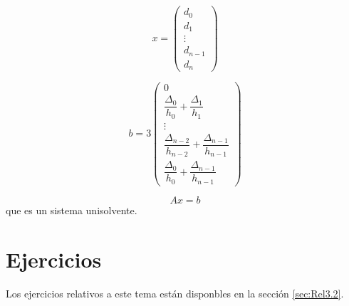$$x=\left( \begin{array}{c}
            d_0     \\
            d_1     \\
            \vdots  \\
            d_{n-1} \\
            d_{n}
        \end{array} \right)$$

$$b=3\left( \begin{array}{c}
            0                                                             \\
            \dfrac{\Delta_0}{h_0} + \dfrac{\Delta_1}{h_1}                 \\
            \vdots                                                        \\
            \dfrac{\Delta_{n-2}}{h_{n-2}} + \dfrac{\Delta_{n-1}}{h_{n-1}} \\
            \dfrac{\Delta_0}{h_0} + \dfrac{\Delta_{n-1}}{h_{n-1}}
        \end{array} \right)$$

$$Ax=b$$
que es un sistema unisolvente.


\section{Ejercicios}
Los ejercicios relativos a este tema están disponbles en la sección \ref{sec:Rel3.2}.
